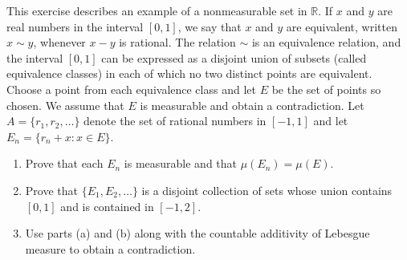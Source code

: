 \begin{problembox}
This exercise describes an example of a nonmeasurable set in $\mathbb{R}$. If $x$ and $y$ are real numbers in the interval $[0, 1]$, we say that $x$ and $y$ are equivalent, written $x \sim y$, whenever $x - y$ is rational. The relation $\sim$ is an equivalence relation, and the interval $[0, 1]$ can be expressed as a disjoint union of subsets (called equivalence classes) in each of which no two distinct points are equivalent. Choose a point from each equivalence class and let $E$ be the set of points so chosen. We assume that $E$ is measurable and obtain a contradiction. Let $A = \{r_1, r_2, \ldots \}$ denote the set of rational numbers in $[-1, 1]$ and let $E_n = \{r_n + x : x \in E\}$.
\begin{enumerate}[label=(\alph*)]
    \item Prove that each $E_n$ is measurable and that $\mu(E_n) = \mu(E)$.
    \item Prove that $\{E_1, E_2, \ldots \}$ is a disjoint collection of sets whose union contains $[0, 1]$ and is contained in $[-1, 2]$.
    \item Use parts (a) and (b) along with the countable additivity of Lebesgue measure to obtain a contradiction.
\end{enumerate}
\end{problembox}

